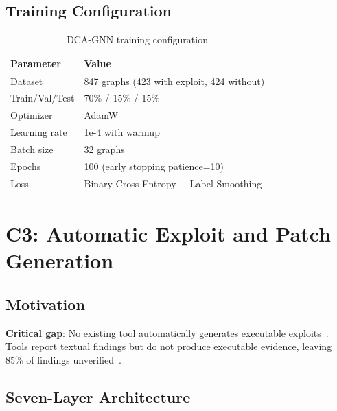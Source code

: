\documentclass[11pt]{article}
\theoremstyle{definition}
\theoremstyle{plain}
\theoremstyle{remark}
\begin{document}
\subsection{Training Configuration}

\begin{table}[H]
\centering
\caption{DCA-GNN training configuration}
\label{tab:gnn_training}
\begin{tabular}{ll}
\toprule
\textbf{Parameter} & \textbf{Value} \\
\midrule
Dataset & 847 graphs (423 with exploit, 424 without) \\
Train/Val/Test & 70\% / 15\% / 15\% \\
Optimizer & AdamW~\cite{loshchilov2017decoupled} \\
Learning rate & 1e-4 with warmup \\
Batch size & 32 graphs \\
Epochs & 100 (early stopping patience=10) \\
Loss & Binary Cross-Entropy + Label Smoothing \\
\bottomrule
\end{tabular}
\end{table}

\section{C3: Automatic Exploit and Patch Generation}
\label{sec:gaev}

\subsection{Motivation}

\textbf{Critical gap}: No existing tool automatically generates executable exploits~\cite{zhang2023demystifying}. Tools report textual findings but do not produce executable evidence, leaving 85\% of findings unverified~\cite{chen2021defiranger}.

\subsection{Seven-Layer Architecture}
\end{document}
